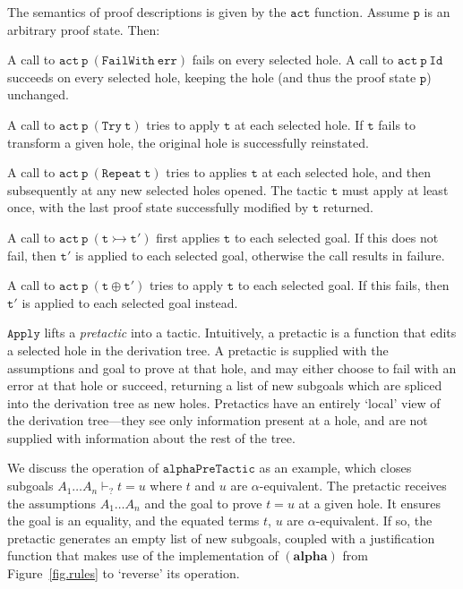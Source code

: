 \documentclass{llncs}
\newcommand{\rulefont}[1]{\ensuremath{(\mathbf{#1})}}
\begin{document}
The semantics of proof descriptions is given by the $\mathtt{act}$ function.
Assume $\mathtt{p}$ is an arbitrary proof state.
Then:
\begin{itemize*}
\item
A call to $\mathtt{act\ p\ (FailWith\ err)}$ fails on every selected hole.
A call to $\mathtt{act\ p\ Id}$ succeeds on every selected hole, keeping the hole (and thus the proof state $\mathtt{p}$) unchanged.
\item
A call to $\mathtt{act\ p\ (Try\ t)}$ tries to apply $\mathtt{t}$ at each selected hole.
If $\mathtt{t}$ fails to transform a given hole, the original hole is successfully reinstated.
\item
A call to $\mathtt{act\ p\ (Repeat\ t)}$ tries to applies $\mathtt{t}$ at each selected hole, and then subsequently at any new selected holes opened.
The tactic $\mathtt{t}$ must apply at least once, with the last proof state successfully modified by $\mathtt{t}$ returned.
\item
A call to $\mathtt{act\ p\ (t \rightarrowtail t')}$ first applies $\mathtt{t}$ to each selected goal.
If this does not fail, then $\mathtt{t'}$ is applied to each selected goal, otherwise the call results in failure.
\item
A call to $\mathtt{act\ p\ (t \oplus t')}$ tries to apply $\mathtt{t}$ to each selected goal.
If this fails, then $\mathtt{t'}$ is applied to each selected goal instead.
\end{itemize*}
$\mathtt{Apply}$ lifts a \emph{pretactic} into a tactic.
Intuitively, a pretactic is a function that edits a selected hole in the derivation tree.
A pretactic is supplied with the assumptions and goal to prove at that hole, and may either choose to fail with an error at that hole or succeed, returning a list of new subgoals which are spliced into the derivation tree as new holes.
Pretactics have an entirely `local' view of the derivation tree---they see only information present at a hole, and are not supplied with information about the rest of the tree.

We discuss the operation of $\mathtt{alphaPreTactic}$ as an example, which closes subgoals $A_1 \ldots A_n \vdash_? t = u$ where $t$ and $u$ are $\alpha$-equivalent.
The pretactic receives the assumptions $A_1 \ldots A_n$ and the goal to prove $t = u$ at a given hole.
It ensures the goal is an equality, and the equated terms $t$, $u$ are $\alpha$-equivalent.
If so, the pretactic generates an empty list of new subgoals, coupled with a justification function that makes use of the implementation of \rulefont{alpha} from Figure~\ref{fig.rules} to `reverse' its operation.
\end{document}
